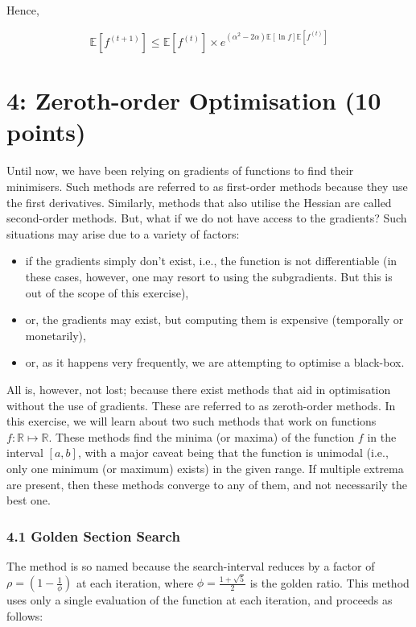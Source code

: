 \documentclass{article}
\begin{document}
Hence,

$$\mathbb{E}[f^{(t + 1)}] \leq \mathbb{E}[f^{(t)}] \times e^{(\alpha^2 - 2\alpha) \mathbb{E}[\ln f]\mathbb{E}[f^{(t)}]}$$

\clearpage
\newpage

\part*{4: Zeroth-order Optimisation (10 points)}

Until now, we have been relying on gradients of functions to find their minimisers. Such methods are referred to as first-order methods because they use the first derivatives. Similarly, methods that also utilise the Hessian are called second-order methods. But, what if we do not have access to the gradients? Such situations may arise due to a variety of factors:

\begin{itemize}
    \item if the gradients simply don't exist, i.e., the function is not differentiable (in these cases, however, one may resort to using the subgradients. But this is out of the scope of this exercise),
    \item or, the gradients may exist, but computing them is expensive (temporally or monetarily),
    \item or, as it happens very frequently, we are attempting to optimise a black-box.
\end{itemize}

All is, however, not lost; because there exist methods that aid in optimisation without the use of gradients. These are referred to as zeroth-order methods. In this exercise, we will learn about two such methods that work on functions $f: \mathbb{R} \mapsto \mathbb{R}$. These methods find the minima (or maxima) of the function $f$ in the interval $[a, b]$, with a major caveat being that the function is unimodal (i.e., only one minimum (or maximum) exists) in the given range. If multiple extrema are present, then these methods converge to any of them, and not necessarily the best one.

\section*{4.1 Golden Section Search}

The method is so named because the search-interval reduces by a factor of $\rho = \left(1 - \frac{1}{\phi}\right)$ at each iteration, where $\phi = \frac{1 + \sqrt{5}}{2}$ is the golden ratio. This method uses only a single evaluation of the function at each iteration, and proceeds as follows:
\end{document}

